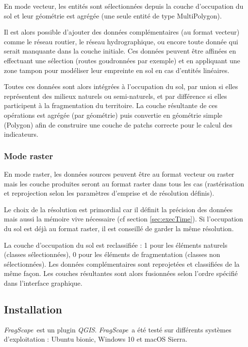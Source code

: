 \documentclass[11pt]{article}
\newcommand{\tool}{\emph{FragScape}}
\newcommand{\qgis}{\emph{QGIS}}
\begin{document}
En mode vecteur, les entités sont sélectionnées depuis la couche d'occupation du sol et leur géométrie est agrégée (une seule entité de type MultiPolygon).

Il est alors possible d'ajouter des données complémentaires (au format vecteur) comme le réseau routier, le réseau hydrographique, ou encore toute donnée qui serait manquante dans la couche initiale. Ces données peuvent être affinées en effectuant une sélection (routes goudronnées par exemple) et en appliquant une zone tampon pour modéliser leur empreinte en sol en cas d'entités linéaires.

Toutes ces données sont alors intégrées à l'occupation du sol, par union si elles représentent des milieux naturels ou semi-naturels, et par différence si elles participent à la fragmentation du territoire. La couche résultante de ces opérations est agrégée (par géométrie) puis convertie en géométrie simple (Polygon) afin de construire une couche de patchs correcte pour le calcul des indicateurs.

\subsubsection{Mode raster}

En mode raster, les données sources peuvent être au format vecteur ou raster mais les couche produites seront au format raster dans tous les cas (rastérisation et reprojection selon les paramètres d'emprise et de résolution définis).

Le choix de la résolution est primordial car il définit la précision des données mais aussi la mémoire vive nécessaire (cf section \ref{sec:execTime}). Si l'occupation du sol est déjà au format raster, il est conseillé de garder la même résolution.

La couche d'occupation du sol est reclassifiée : 1 pour les éléments naturels (classes sélectionnées), 0 pour les éléments de fragmentation (classes non sélectionnées).
Les données complémentaires sont reprojetées et classifiées de la même façon. Les couches résultantes sont alors fusionnées selon l'ordre spécifié dans l'interface graphique.


\subsection{Installation}

\tool\ est un plugin \qgis. \tool\ a été testé sur différents systèmes d'exploitation : Ubuntu bionic, Windows 10 et macOS Sierra.
\end{document}
